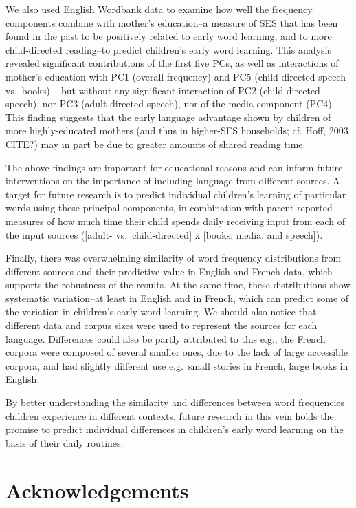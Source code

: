 \documentclass[10pt, letterpaper]{article}
\begin{document}
We also used English Wordbank data to examine how well the frequency
components combine with mother's education--a measure of SES that has
been found in the past to be positively related to early word learning,
and to more child-directed reading--to predict children's early word
learning. This analysis revealed significant contributions of the first
five PCs, as well as interactions of mother's education with PC1
(overall frequency) and PC5 (child-directed speech vs.~books) -- but
without any significant interaction of PC2 (child-directed speech), nor
PC3 (adult-directed speech), nor of the media component (PC4). This
finding suggests that the early language advantage shown by children of
more highly-educated mothers (and thus in higher-SES households; cf.
Hoff, 2003 CITE?) may in part be due to greater amounts of shared
reading time.

The above findings are important for educational reasons and can inform
future interventions on the importance of including language from
different sources. A target for future research is to predict individual
children's learning of particular words using these principal
components, in combination with parent-reported measures of how much
time their child spends daily receiving input from each of the input
sources ({[}adult- vs.~child-directed{]} x {[}books, media, and
speech{]}).

Finally, there was overwhelming similarity of word frequency
distributions from different sources and their predictive value in
English and French data, which supports the robustness of the results.
At the same time, these distributions show systematic variation--at
least in English and in French, which can predict some of the variation
in children's early word learning. We should also notice that different
data and corpus sizes were used to represent the sources for each
language. Differences could also be partly attributed to this e.g., the
French corpora were composed of several smaller ones, due to the lack of
large accessible corpora, and had slightly different use e.g.~small
stories in French, large books in English.

By better understanding the similarity and differences between word
frequencies children experience in different contexts, future research
in this vein holds the promise to predict individual differences in
children's early word learning on the basis of their daily routines.

\hypertarget{acknowledgements}{%
\section{Acknowledgements}\label{acknowledgements}}
\end{document}
